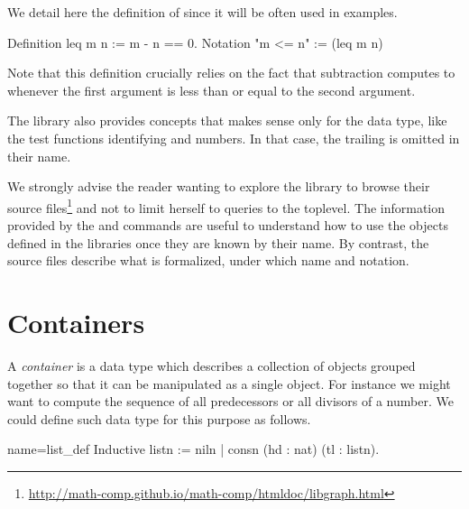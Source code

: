 We detail here the definition of  since it will be often used
in examples.
\begin{coq}{}{}
Definition leq m n := m - n == 0.
Notation "m <= n" := (leq m n)
\end{coq}
Note that this definition crucially relies on the fact that
subtraction computes to  whenever the first argument is less than
or equal to the second argument.

The \mcbMC{} library also provides concepts that makes sense only
for the  data type, like the
test functions identifying  and  numbers. In that
case, the trailing  is omitted in their name.

We strongly advise the reader wanting to explore the \mcbMC{} library
to browse their source
files\footnote{\url{http://math-comp.github.io/math-comp/htmldoc/libgraph.html}}
and not to limit herself to queries to the toplevel. The
information provided by the  and  commands are
useful to understand how to use the objects defined in the libraries
once they are known by their name. By contrast, the source
files describe what is formalized, under which name and notation.



\section{Containers}\label{sec:poly}


A \emph{container} is a data type which describes a collection of
objects grouped together so that it can be manipulated as a single
object. For instance we might want to compute the sequence of all
predecessors or all divisors of a number.  We could define such data
type for this purpose as follows.

\begin{coq}{name=list_def}{}
Inductive listn := niln | consn (hd : nat) (tl : listn).
\end{coq}

